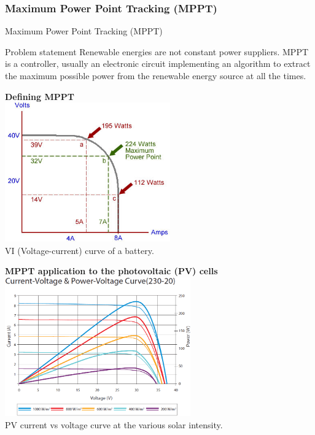 \documentclass{beamer}
\begin{document}
\subsubsection{Maximum Power Point Tracking (MPPT)}
\begin{frame}[allowframebreaks]{Maximum Power Point Tracking (MPPT)}
	\begin{block}{Problem statement}
		Renewable energies are not constant power suppliers. MPPT is a controller, usually an electronic circuit implementing an algorithm to extract the maximum possible power from the renewable energy source at all the times.
	\end{block}
	\framebreak
	\begin{center}
		\textbf{Defining MPPT}\\
		\includegraphics[height=6cm]{images/mppt-power-source}\\
		VI (Voltage-current) curve of a battery.
	\end{center}
	\framebreak
	\begin{center}
		\textbf{MPPT application to the photovoltaic (PV) cells}\\
		\includegraphics[height=6cm]{images/mppt-solar}\\
		PV current vs voltage curve at the various solar intensity.
	\end{center}
	\framebreak
	\begin{center}

\end{center}
\end{frame}
\end{document}
